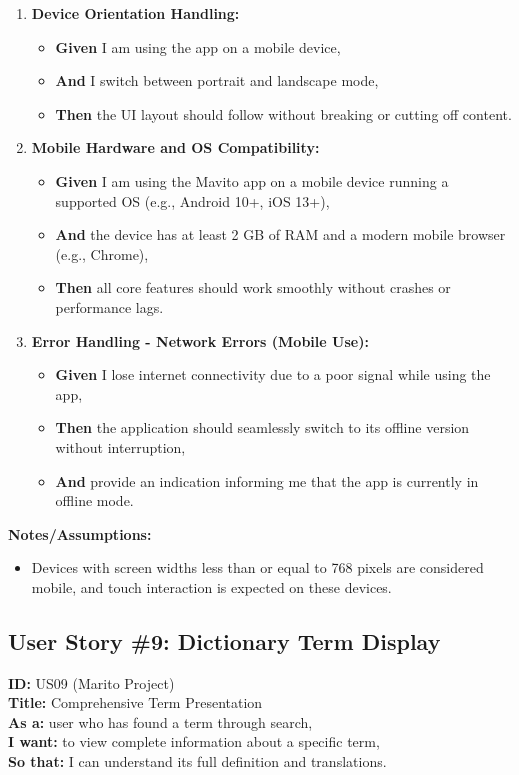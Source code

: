 \documentclass[12pt]{article}
\begin{document}
\begin{enumerate}
    \item \textbf{Device Orientation Handling:}
    \begin{itemize}
        \item \textbf{Given} I am using the app on a mobile device,
        \item \textbf{And} I switch between portrait and landscape mode,
        \item \textbf{Then} the UI layout should follow without breaking or cutting off content.
    \end{itemize}

    \item \textbf{Mobile Hardware and OS Compatibility:}
    \begin{itemize}
        \item \textbf{Given} I am using the Mavito app on a mobile device running a supported OS (e.g., Android 10+, iOS 13+),
        \item \textbf{And} the device has at least 2 GB of RAM and a modern mobile browser (e.g., Chrome),
        \item \textbf{Then} all core features should work smoothly without crashes or performance lags.
    \end{itemize}

    \item \textbf{Error Handling - Network Errors (Mobile Use):}
    \begin{itemize}
        \item \textbf{Given} I lose internet connectivity due to a poor signal while using the app,
        \item \textbf{Then} the application should seamlessly switch to its offline version without interruption,
        \item \textbf{And} provide an indication informing me that the app is currently in offline mode.
    \end{itemize}
\end{enumerate}

\vspace{1em}
\textbf{Notes/Assumptions:}
\begin{itemize}
    \item Devices with screen widths less than or equal to 768 pixels are considered mobile, and touch interaction is expected on these devices.
\end{itemize}

\subsection{User Story \#9: Dictionary Term Display}
\textbf{ID:} US09 (Marito Project) \\
\textbf{Title:} Comprehensive Term Presentation \\
\textbf{As a:} user who has found a term through search, \\
\textbf{I want:} to view complete information about a specific term, \\
\textbf{So that:} I can understand its full definition and translations.
\end{document}
